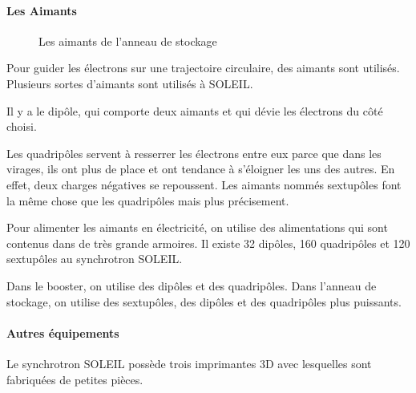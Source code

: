 			\paragraph{Les Aimants}
				\begin{figure}[h]
 				 \centering
 				 \caption{Les aimants de l'anneau de stockage}
				\end{figure}

				Pour guider les électrons sur une trajectoire circulaire, des aimants sont utilisés. Plusieurs sortes d'aimants sont utilisés à SOLEIL.\par Il y a le dipôle, qui comporte deux aimants et qui dévie les électrons du côté choisi. 
				\par Les quadripôles servent à resserrer les électrons entre eux parce que dans les virages, ils ont plus de place et ont tendance à s'éloigner les uns des autres. En effet, deux charges négatives se repoussent. Les aimants nommés sextupôles font la même chose que les quadripôles mais plus précisement. 
				\par Pour alimenter les aimants en électricité, on utilise des alimentations qui sont contenus dans de très grande armoires. Il existe 32 dipôles, 160 quadripôles et 120 sextupôles au synchrotron SOLEIL. 
				\par Dans le booster, on utilise des dipôles et des quadripôles. Dans l'anneau de stockage, on utilise des sextupôles, des dipôles et des quadripôles plus puissants. 

			\paragraph{Autres équipements}
				Le synchrotron SOLEIL possède trois imprimantes 3D avec lesquelles sont fabriquées de petites pièces.

